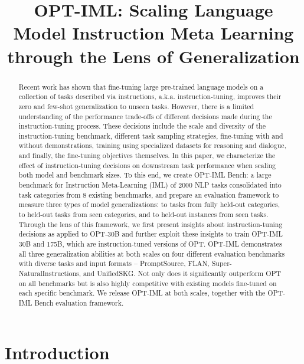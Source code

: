\title{OPT-IML: Scaling Language Model Instruction Meta Learning through the Lens of Generalization}

\begin{abstract}
Recent work has shown that fine-tuning large pre-trained language models on a collection of tasks described via instructions, a.k.a. instruction-tuning, improves their zero and few-shot generalization to unseen tasks. However, there is a limited understanding of the performance trade-offs of different decisions made during the instruction-tuning process. These decisions include the scale and diversity of the instruction-tuning benchmark, different task sampling strategies, fine-tuning with and without demonstrations, training using specialized datasets for reasoning and dialogue, and finally, the fine-tuning objectives themselves. In this paper, we characterize the effect of instruction-tuning decisions on downstream task performance when scaling both model and benchmark sizes. To this end, we create OPT-IML Bench: a large benchmark for Instruction Meta-Learning (IML) of 2000 NLP tasks consolidated into task categories from 8 existing benchmarks, and prepare an evaluation framework to measure three types of model generalizations: to tasks from fully held-out categories, to held-out tasks from seen categories, and to held-out instances from seen tasks. Through the lens of this framework, we first present insights about instruction-tuning decisions as applied to OPT-30B and further exploit these insights to train OPT-IML 30B and 175B, which are instruction-tuned versions of OPT. OPT-IML demonstrates all three generalization abilities at both scales on four different evaluation benchmarks with diverse tasks and input formats -- PromptSource, FLAN, Super-NaturalInstructions, and UnifiedSKG. Not only does it significantly outperform OPT on all benchmarks but is also highly competitive with existing models fine-tuned on each specific benchmark. We release OPT-IML at both scales, together with the OPT-IML Bench evaluation framework.
\end{abstract}

\section{Introduction}


